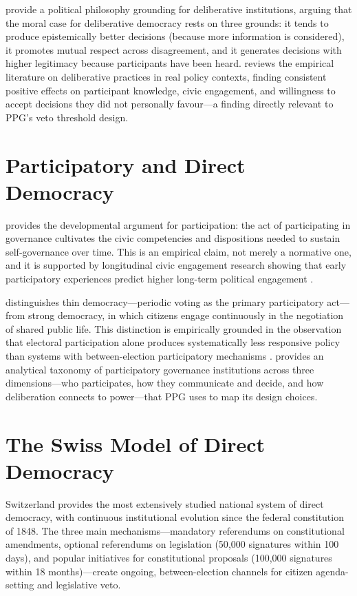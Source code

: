 \documentclass[12pt,a4paper,oneside]{report}
\begin{document}
\citet{gutmann2004deliberating} provide a political philosophy grounding for deliberative institutions, arguing that the moral case for deliberative democracy rests on three grounds: it tends to produce epistemically better decisions (because more information is considered), it promotes mutual respect across disagreement, and it generates decisions with higher legitimacy because participants have been heard. \citet{gastil2010promise} reviews the empirical literature on deliberative practices in real policy contexts, finding consistent positive effects on participant knowledge, civic engagement, and willingness to accept decisions they did not personally favour---a finding directly relevant to PPG's veto threshold design.

\section{Participatory and Direct Democracy}

\citet{pateman1970participation} provides the developmental argument for participation: the act of participating in governance cultivates the civic competencies and dispositions needed to sustain self-governance over time. This is an empirical claim, not merely a normative one, and it is supported by longitudinal civic engagement research showing that early participatory experiences predict higher long-term political engagement \citep{held2006models}.

\citet{barber1984strong} distinguishes thin democracy---periodic voting as the primary participatory act---from strong democracy, in which citizens engage continuously in the negotiation of shared public life. This distinction is empirically grounded in the observation that electoral participation alone produces systematically less responsive policy than systems with between-election participatory mechanisms \citep{fung2006varieties}. \citet{fung2006varieties} provides an analytical taxonomy of participatory governance institutions across three dimensions---who participates, how they communicate and decide, and how deliberation connects to power---that PPG uses to map its design choices.

\section{The Swiss Model of Direct Democracy}

Switzerland provides the most extensively studied national system of direct democracy, with continuous institutional evolution since the federal constitution of 1848. The three main mechanisms---mandatory referendums on constitutional amendments, optional referendums on legislation (50{,}000 signatures within 100 days), and popular initiatives for constitutional proposals (100{,}000 signatures within 18 months)---create ongoing, between-election channels for citizen agenda-setting and legislative veto.
\end{document}
